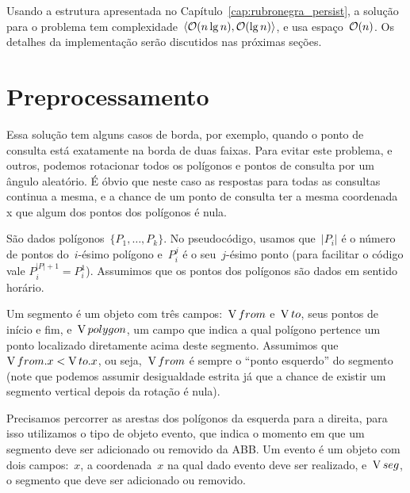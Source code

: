 \documentclass[main.tex]{subfiles}
\begin{document}
Usando a estrutura apresentada no Capítulo~\ref{cap:rubronegra_persist}, a solução para o problema tem complexidade~$\langle\mathcal{O}(n \lg n), \mathcal{O}(\lg n)\rangle$, e usa espaço~$\mathcal{O}(n)$. Os detalhes da implementação serão discutidos nas próximas seções.

\section{Preprocessamento}

Essa solução tem alguns casos de borda, por exemplo, quando o ponto de consulta está exatamente na borda de duas faixas. Para evitar este problema, e outros, podemos rotacionar todos os polígonos e pontos de consulta por um ângulo aleatório. É óbvio que neste caso as respostas para todas as consultas continua a mesma, e a chance de um ponto de consulta ter a mesma coordenada x que algum dos pontos dos polígonos é nula.

\providecommand{\from}{\V{from}}
\providecommand{\tto}{\V{to}}
\providecommand{\seg}{\V{seg}}
\providecommand{\events}{\V{events}}
\providecommand{\rbt}{\V{rbt}}
\providecommand{\slabs}{\V{slabs}}
\providecommand{\current}{\V{current}}
\providecommand{\polygon}{\V{polygon}}

São dados polígonos~$\{P_1, \ldots, P_k\}$. No pseudocódigo, usamos que~$|P_i|$ é o número de pontos do~$i$-ésimo polígono e~$P_i^j$ é o seu~$j$-ésimo ponto (para facilitar o código vale ${P_i^{|P|+1} = P_i^1}$). Assumimos que os pontos dos polígonos são dados em sentido horário.

Um segmento é um objeto com três campos:~$\from$ e~$\tto$, seus pontos de início e fim, e~$\polygon$, um campo que indica a qual polígono pertence um ponto localizado diretamente acima deste segmento. Assumimos que~$\from.x < \tto.x$, ou seja,~$\from$ é sempre o ``ponto esquerdo'' do segmento (note que podemos assumir desigualdade estrita já que a chance de existir um segmento vertical depois da rotação é nula).

Precisamos percorrer as arestas dos polígonos da esquerda para a direita, para isso utilizamos o tipo de objeto evento, que indica o momento em que um segmento deve ser adicionado ou removido da ABB. Um evento é um objeto com dois campos:~$x$, a coordenada~$x$ na qual dado evento deve ser realizado, e~$\seg$, o segmento que deve ser adicionado ou removido.
\end{document}
